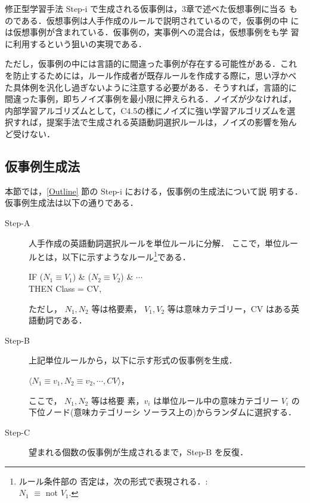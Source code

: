 \bigskip
修正型学習手法 Step-i で生成される仮事例は，3章で述べた仮想事例に当る
ものである．仮想事例は人手作成のルールで説明されているので，仮事例の中
には仮想事例が含まれている．仮事例の，実事例への混合は，仮想事例をも学
習に利用するという狙いの実現である．

ただし，仮事例の中には言語的に間違った事例が存在する可能性がある．これ
を防止するためには，ルール作成者が既存ルールを作成する際に，思い浮かべ
た具体例を汎化し過ぎないように注意する必要がある．そうすれば，言語的に
間違った事例，即ちノイズ事例を最小限に押えられる．ノイズが少なければ，
内部学習アルゴリズムとして，C4.5の様にノイズに強い学習アルゴリズムを選
択すれば，提案手法で生成される英語動詞選択ルールは，ノイズの影響を殆ん
ど受けない．

\subsection{仮事例生成法\label{GenerationMethod}}
本節では，\ref{Outline} 節の Step-i における，仮事例の生成法について説
明する．仮事例生成法は以下の通りである．

\bigskip
\begin{description}
\item[Step-A] 人手作成の英語動詞選択ルールを単位ルールに分解．
ここで，単位ルールとは，以下に示すようなルール\footnote{ルール条件部の
否定は，次の形式で表現される．: \\$N_1$ $\equiv$ not $V_1$.}である．
\begin{flushleft}
IF  ($N_1 \equiv V_1$) \& ($N_2 \equiv V_2$) \& $\cdots$   \\
THEN Class = CV,\\
\end{flushleft}
ただし，
$N_1, N_2$ 等は格要素，
$V_1, V_2$ 等は意味カテゴリー，CV はある英語動詞である．

\item[Step-B]上記単位ルールから，以下に示す形式の仮事例を生成．
\begin{flushleft}
        $\langle N_1 \equiv v_1, N_2 \equiv v_2, \cdots ,CV \rangle$，\\
\end{flushleft}
ここで， $N_1, N_2$ 等は格要
素，$v_i$ は単位ルール中の意味カテゴリー $V_i$ の下位ノード(意味カテゴリーシ
ソーラス上の)からランダムに選択する．

\item[Step-C] 望まれる個数の仮事例が生成されるまで，Step-B を反復．
\end{description}

